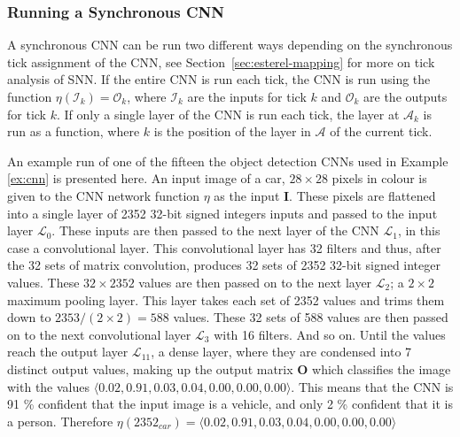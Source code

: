 \subsubsection{Running a Synchronous CNN}
A synchronous CNN can be run two different ways depending on the synchronous tick assignment of the CNN, see Section~\ref{sec:esterel-mapping} for more on tick analysis of \ac{SNN}. 
If the entire CNN is run each tick, the CNN is run using the function $\eta(\mathcal{I}_k) = \mathcal{O}_k$, where $\mathcal{I}_k$ are the inputs for tick $k$ and $\mathcal{O}_k$ are the outputs for tick $k$.
If only a single layer of the CNN is run each tick, the layer at $\mathcal{A}_k$ is run as a function, where $k$ is the position of the layer in $\mathcal{A}$ of the current tick.

\begin{example}
	\label{ex:runcnn}
	An example run of one of the fifteen the object detection \acp{CNN} used in Example \ref{ex:cnn} is presented here.
	An input image of a car, $28 \times 28$ pixels in colour is given to the \ac{CNN} network function $\eta$ as the input \textbf{I}.
	These pixels are flattened into a single layer of 2352 32-bit signed integers inputs and passed to the input layer $\mathcal{L}_0$.
	These inputs are then passed to the next layer of the \ac{CNN} $\mathcal{L}_1$, in this case a convolutional layer.
	This convolutional layer has 32 filters and thus, after the 32 sets of matrix convolution, produces 32 sets of 2352 32-bit signed integer values.
	These $32 \times 2352$ values are then passed on to the next layer $\mathcal{L}_2$; a $2 \times 2$ maximum pooling layer.
	This layer takes each set of 2352 values and trims them down to $2353 / (2 \times 2) = 588$ values.
	These 32 sets of 588 values are then passed on to the next convolutional layer $\mathcal{L}_3$ with 16 filters.
	And so on.
	Until the values reach the output layer $\mathcal{L}_11$, a dense layer, where they are condensed into 7 distinct output values, making up the output matrix \textbf{O} which classifies the image with the values $\langle 0.02, 0.91, 0.03, 0.04, 0.00, 0.00, 0.00 \rangle$.
	This means that the \ac{CNN} is 91 \% confident that the input image is a vehicle, and only 2 \% confident that it is a person.
	Therefore $\eta(2352_{car}) = \langle 0.02, 0.91, 0.03, 0.04, 0.00, 0.00, 0.00 \rangle$
\end{example}

